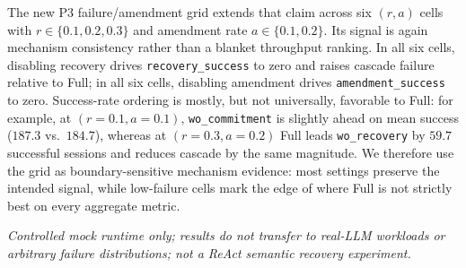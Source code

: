 \documentclass[sigconf,review,anonymous]{acmart}
\begin{document}
The new P3 failure/amendment grid extends that claim across six $(r,a)$ cells with $r\in\{0.1,0.2,0.3\}$ and amendment rate $a\in\{0.1,0.2\}$. Its signal is again mechanism consistency rather than a blanket throughput ranking. In all six cells, disabling recovery drives \texttt{recovery\_success} to zero and raises cascade failure relative to Full; in all six cells, disabling amendment drives \texttt{amendment\_success} to zero. Success-rate ordering is mostly, but not universally, favorable to Full: for example, at $(r{=}0.1,a{=}0.1)$, \texttt{wo\_commitment} is slightly ahead on mean success ($187.3$ vs.\ $184.7$), whereas at $(r{=}0.3,a{=}0.2)$ Full leads \texttt{wo\_recovery} by $59.7$ successful sessions and reduces cascade by the same magnitude. We therefore use the grid as boundary-sensitive mechanism evidence: most settings preserve the intended signal, while low-failure cells mark the edge of where Full is not strictly best on every aggregate metric.

\begin{table}[t]
\centering
\caption{Controlled runtime recovery evaluation under injected recoverable failures
  (\textit{failure\_rate}$\,{=}\,0.3$, $S{=}50$ sessions, $N{=}5$ steps, failure injected at step~2,
  5 independent seeds; P\&S mode only; mock handlers, no real LLM).
  \emph{Recovered} = sessions rescued via checkpoint resume per run.
  \emph{Waste Steps} = tool-call steps that do not contribute to the final successful trajectory,
  including discarded prefix work and failed interrupted calls.
  \emph{Avoided Replay} = steps saved by PlanGate-R relative to naive retry (mean over seeds).}
\label{tab:plangate_r_recovery}
\small
{}
\vspace{-0.3em}
{\footnotesize \textit{Controlled mock runtime only; results do not transfer to real-LLM workloads or arbitrary failure distributions; not a ReAct semantic recovery experiment.}}
\end{table}
\end{document}
